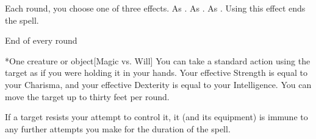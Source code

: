 \begin{comment}
\subsubsection{T}
\end{comment}

\begin{spellheader}
    \spellrng{\rngmed}
\end{spellheader}
\begin{spelleffects}
    \spellspecial Each round, you choose one of three effects.
     As .
     As .
     As . Using this effect ends the spell.
\end{spelleffects}
\begin{spellfooter}
    
\end{spellfooter}

\begin{spellheader}
    \spellrng{\rngmed}
\end{spellheader}
\begin{spelleffects}
    \begin{spelltrigger}{End of every round}
        \begin{spelltarget}*{One creature or object}[Magic vs. Will]
            \spellsuccess You can take a standard action using the target as if you were holding it in your hands. Your effective Strength is equal to your Charisma, and your effective Dexterity is equal to your Intelligence. You can move the target up to thirty feet per round.
        \end{spelltarget}
    \end{spelltrigger}
\end{spelleffects}
\begin{spellfooter}
    \spellnotes If a target resists your attempt to control it, it (and its equipment) is immune to any further attempts you make for the duration of the spell.
\end{spellfooter}

